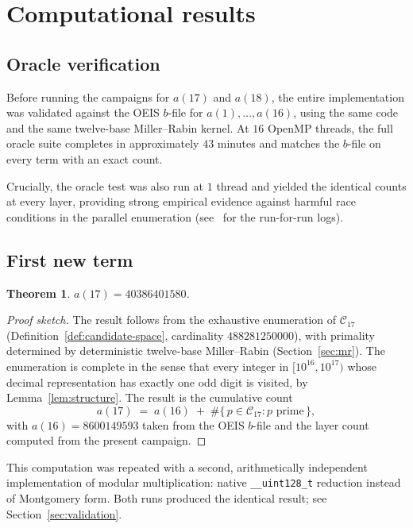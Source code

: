 \documentclass[11pt,a4paper]{article}
\newtheorem{theorem}{Theorem}
\theoremstyle{definition}
\begin{document}
\section{Computational results}\label{sec:results}

\subsection{Oracle verification}\label{sec:oracle}

Before running the campaigns for $a(17)$ and $a(18)$, the entire
implementation was validated against the OEIS $b$-file for
$a(1), \ldots, a(16)$, using the same code and the same twelve-base
Miller--Rabin kernel. At $16$ OpenMP threads, the full oracle suite
completes in approximately $43$ minutes and matches the $b$-file
on every term with an exact count.

Crucially, the oracle test was also run at $1$ thread and yielded the
identical counts at every layer, providing strong empirical evidence
against harmful race conditions in the parallel enumeration
(see~\cite{Repo} for the run-for-run logs).

\subsection{First new term}

\begin{theorem}\label{thm:a17}
$a(17) = \num{40386401580}$.
\end{theorem}

\begin{proof}[Proof sketch]
The result follows from the exhaustive enumeration of $\mathcal{C}_{17}$
(Definition~\ref{def:candidate-space}, cardinality $\num{488281250000}$),
with primality determined by deterministic twelve-base Miller--Rabin
(Section~\ref{sec:mr}). The enumeration is complete in the sense that every
integer in $[10^{16}, 10^{17})$ whose decimal representation has exactly one
odd digit is visited, by Lemma~\ref{lem:structure}. The result is the
cumulative count
\[
  a(17) \;=\; a(16) \;+\; \#\{\, p \in \mathcal{C}_{17} : p \text{ prime}\,\},
\]
with $a(16) = \num{8600149593}$ taken from the OEIS $b$-file and the layer
count computed from the present campaign.
\end{proof}

This computation was repeated with a second, arithmetically independent
implementation of modular multiplication: native \texttt{\_\_uint128\_t}
reduction instead of Montgomery form. Both runs produced the identical
result; see Section~\ref{sec:validation}.
\end{document}
